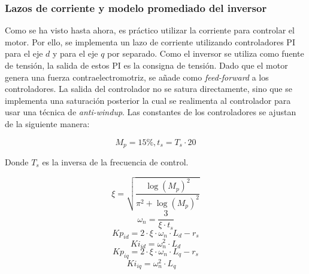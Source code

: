 \subsubsection{Lazos de corriente y modelo promediado del inversor}

Como se ha visto hasta ahora, es práctico utilizar la corriente para controlar el motor. Por ello, se implementa un lazo de corriente utilizando controladores PI para el eje $d$ y para el eje $q$ por separado. Como el inversor se utiliza como fuente de tensión, la salida de estos PI es la consigna de tensión. Dado que el motor genera una fuerza contraelectromotriz, se añade como \textit{feed-forward} a los controladores. La salida del controlador no se satura directamente, sino que se implementa una saturación posterior la cual se realimenta al controlador para usar una técnica de \textit{anti-windup}. Las constantes de los controladores se ajustan de la siguiente manera:

\[
M_p = 15\% , t_s = T_s \cdot 20
\]

Donde $T_s$ es la inversa de la frecuencia de control.

\[
\xi = \sqrt{\frac{\log(M_p)^2}{\pi^2 + \log(M_p)^2}}
\]
\[
\omega_n = \frac{3}{\xi \cdot t_s}
\]
\[
Kp_{id} = 2 \cdot \xi \cdot \omega_n \cdot L_d - r_s
\]
\[
Ki_{id} = \omega_n^2 \cdot L_d
\]
\[
Kp_{iq} = 2 \cdot \xi \cdot \omega_n \cdot L_q - r_s
\]
\[
Ki_{iq} = \omega_n^2 \cdot L_q \quad
\]

